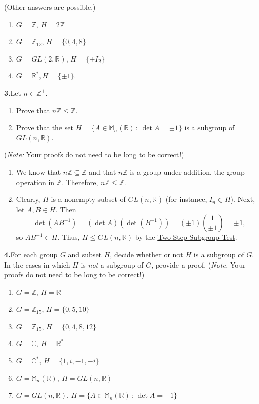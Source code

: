 \documentclass[10pt,]{book}
\theoremstyle{plain}
\theoremstyle{definition}
\theoremstyle{definition}
\theoremstyle{definition}
\theoremstyle{definition}
\numberwithin{equation}{section}
\def\Z{\mathbb{Z}}
\def\R{\mathbb{R}}
\def\C{\mathbb{C}}
\def\M{\mathbb{M}}
\begin{document}
(Other answers are possible.) \leavevmode%
\begin{enumerate}[label=(\alph*)]
\item\hypertarget{li-224}{}\(G=\Z\), \(H=2\Z\)%
\item\hypertarget{li-225}{}\(G=\Z_{12}\), \(H=\{0,4,8\}\)%
\item\hypertarget{li-226}{}\(G=GL(2,\R)\), \(H=\{\pm I_2\}\)%
\item\hypertarget{li-227}{}\(G=\R^*, H=\{\pm 1\}\).%
\end{enumerate}
%
\par\smallskip
\noindent\textbf{3.}\quad{}Let \(n\in \Z^+\). \leavevmode%
\begin{enumerate}[label=(\alph*)]
\item\hypertarget{li-228}{}Prove that \(n\Z \leq \Z\).%
\item\hypertarget{li-229}{}Prove that the set \(H=\{A\in \M_n(\R)\,:\,\det A=\pm 1\}\) is a subgroup of \(GL(n,\R)\).%
\end{enumerate}
%
\par
(\emph{Note:} Your proofs do not need to be long to be correct!)%
\par\smallskip
\leavevmode%
\begin{enumerate}[label=(\alph*)]
\item\hypertarget{li-230}{}We know that \(n\Z\subseteq \Z\) and that \(n\Z\) is a group under addition, the group operation in \(\Z\).  Therefore, \(n\Z\leq \Z\).%
\item\hypertarget{li-231}{}Clearly, \(H\) is a nonempty subset of \(GL(n,\R)\) (for instance, \(I_n\in H\)).  Next, let \(A,B\in H\). Then%
\begin{equation*}
\det(AB^{-1})=(\det A)(\det (B^{-1}))=(\pm 1)\left(\frac{1}{\pm 1}\right)=\pm 1,
\end{equation*}
so \(AB^{-1}\in H\).  Thus, \(H\leq GL(n,\R)\) by the \hyperref[twostep]{Two-Step Subgroup Test}.%
\end{enumerate}
\par\smallskip
\noindent\textbf{4.}\quad{}For each group \(G\) and subset \(H\), decide whether or not \(H\) is a subgroup of \(G\). In the cases in which \(H\) is \emph{not} a subgroup of \(G\), provide a proof. (\emph{Note.} Your proofs do not need to be long to be correct!) \leavevmode%
\begin{enumerate}[label=(\alph*)]
\item\hypertarget{li-232}{}\(G=\Z\), \(H=\R\)%
\item\hypertarget{li-233}{}\(G=\Z_{15}\), \(H=\{0,5,10\}\)%
\item\hypertarget{li-234}{}\(G=\Z_{15}\), \(H=\{0,4,8,12\}\)%
\item\hypertarget{li-235}{}\(G=\C\), \(H=\R^*\)%
\item\hypertarget{li-236}{}\(G=\C^*\), \(H=\{1,i,-1,-i\}\)%
\item\hypertarget{li-237}{}\(G=\M_n(\R)\), \(H=GL(n,\R)\)%
\item\hypertarget{li-238}{}\(G=GL(n,\R)\), \(H=\{A\in \M_n(\R)\,:\,\det A = -1\}\)%
\end{enumerate}
\end{document}
